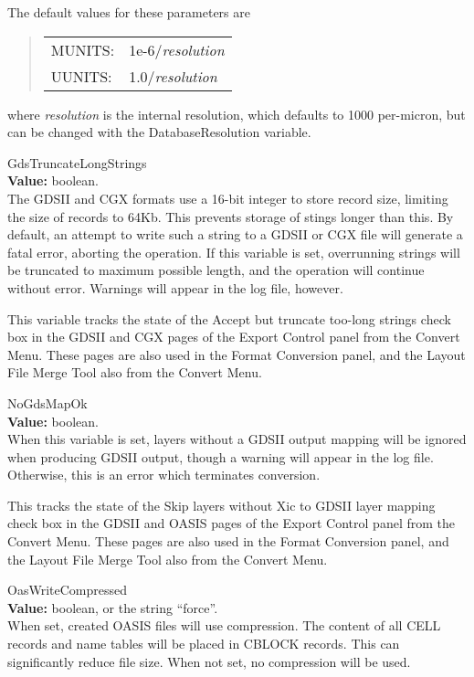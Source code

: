 \begin{description}
The default values for these parameters are
\begin{quote}
\begin{tabular}{ll}
MUNITS: & 1e-6/{\it resolution}\\
UUNITS: & 1.0/{\it resolution}\\
\end{tabular}
\end{quote}
where {\it resolution} is the internal resolution, which defaults to
1000 per-micron, but can be changed with the {\et DatabaseResolution}
variable.

\item{\et GdsTruncateLongStrings}\\
{\bf Value:} boolean.\\
The GDSII and CGX formats use a 16-bit integer to store record size,
limiting the size of records to 64Kb.  This prevents storage of stings
longer than this.  By default, an attempt to write such a string to a
GDSII or CGX file will generate a fatal error, aborting the operation. 
If this variable is set, overrunning strings will be truncated to
maximum possible length, and the operation will continue without
error.  Warnings will appear in the log file, however.

This variable tracks the state of the {\cb Accept but truncate
too-long strings} check box in the {\cb GDSII} and {\cb CGX} pages of
the {\cb Export Control} panel from the {\cb Convert Menu}.  These
pages are also used in the {\cb Format Conversion} panel, and the {\cb
Layout File Merge Tool} also from the {\cb Convert Menu}.

\item{\et NoGdsMapOk}\\
{\bf Value:} boolean.\\
When this variable is set, layers without a GDSII output mapping will
be ignored when producing GDSII output, though a warning will appear
in the log file.  Otherwise, this is an error which terminates
conversion.

This tracks the state of the {\cb Skip layers without Xic to GDSII
layer mapping} check box in the {\cb GDSII} and {\cb OASIS} pages of
the {\cb Export Control} panel from the {\cb Convert Menu}.  These
pages are also used in the {\cb Format Conversion} panel, and the {\cb
Layout File Merge Tool} also from the {\cb Convert Menu}.

\item{\et OasWriteCompressed}\\
{\bf Value:} boolean, or the string ``{\vt force}''.\\
When set, created OASIS files will use compression.  The content of
all CELL records and name tables will be placed in CBLOCK records. 
This can significantly reduce file size.  When not set, no compression
will be used.


\end{description}
